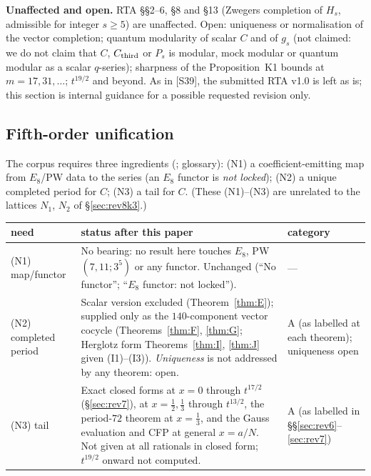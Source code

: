\noindent\textbf{Unaffected and open.} RTA \S\S2--6, \S8 and \S13 (Zwegers completion of $H_s$, admissible for integer $s\ge5$) are unaffected. Open: uniqueness or normalisation of the vector completion; quantum modularity of scalar $C$ and of $g_s$ (not claimed: we do not claim that $C$, $C_{\mathrm{third}}$ or $P_s$ is modular, mock modular or quantum modular as a scalar $q$-series); sharpness of the Proposition~K1 bounds at $m=17,31,\dots$; $t^{19/2}$ and beyond. As in [S39], the submitted RTA v1.0 is left as is; this section is internal guidance for a possible requested revision only.

\subsection{Fifth-order unification}\label{sec:rev8fifth}
The corpus requires three ingredients (; glossary): \textsf{(N1)} a coefficient-emitting map from $E_8$/PW data to the series (an $E_8$ functor is \emph{not locked}); \textsf{(N2)} a unique completed period for $C$; \textsf{(N3)} a tail for $C$. (These \textsf{(N1)}--\textsf{(N3)} are unrelated to the lattices $N_1$, $N_2$ of \S\ref{sec:rev8k3}.)
\begin{center}\small
\begin{longtable}{p{2.2cm}p{8.3cm}p{4.2cm}}\toprule
need & status after this paper & category\\\midrule\endhead
\textsf{(N1)} map/functor & No bearing: no result here touches $E_8$, PW$(7,11;3^5)$ or any functor. Unchanged (``No functor''; ``$E_8$ functor: not locked''). & ---\\
\textsf{(N2)} completed period & Scalar version excluded (Theorem~\ref{thm:E}); supplied only as the $140$-component vector cocycle (Theorems~\ref{thm:F}, \ref{thm:G}; Herglotz form Theorems~\ref{thm:I}, \ref{thm:J} given (I1)--(I3)). \emph{Uniqueness} is not addressed by any theorem: open. & A (as labelled at each theorem); uniqueness open\\
\textsf{(N3)} tail & Exact closed forms at $x=0$ through $t^{17/2}$ (\S\ref{sec:rev7}), at $x=\tfrac12,\tfrac13$ through $t^{13/2}$, the period-$72$ theorem at $x=\tfrac13$, and the Gauss evaluation and CFP at general $x=a/N$. Not given at all rationals in closed form; $t^{19/2}$ onward not computed. & A (as labelled in \S\S\ref{sec:rev6}--\ref{sec:rev7})\\\bottomrule
\end{longtable}
\end{center}

